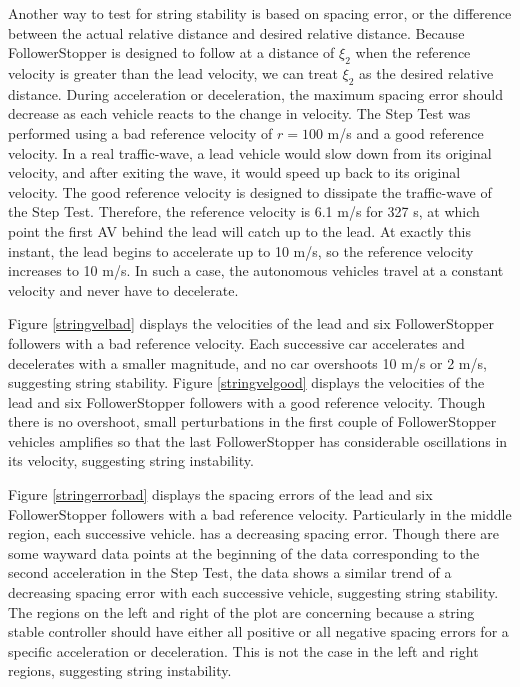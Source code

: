 \documentclass[conference]{IEEEtran}
\begin{document}
Another way to test for string stability is based on spacing error, or the difference between the actual relative distance and desired relative distance. Because FollowerStopper is designed to follow at a distance of $\xi_2$ when the reference velocity is greater than the lead velocity, we can treat $\xi_2$ as the desired relative distance. During acceleration or deceleration, the maximum spacing error should decrease as each vehicle reacts to the change in velocity. The Step Test was performed using a bad reference velocity of $r=100$ m/s and a good reference velocity. In a real traffic-wave, a lead vehicle would slow down from its original velocity, and after exiting the wave, it would speed up back to its original velocity. The good reference velocity is designed to dissipate the traffic-wave of the Step Test. Therefore, the reference velocity is 6.1 m/s for 327 s, at which point the first AV behind the lead will catch up to the lead. At exactly this instant, the lead begins to accelerate up to 10 m/s, so the reference velocity increases to 10 m/s. In such a case, the autonomous vehicles travel at a constant velocity and never have to decelerate.

Figure \ref{stringvelbad} displays the velocities of the lead and six FollowerStopper followers with a bad reference velocity. Each successive car accelerates and decelerates with a smaller magnitude, and no car overshoots 10 m/s or 2 m/s, suggesting string stability. Figure \ref{stringvelgood} displays the velocities of the lead and six FollowerStopper followers with a good reference velocity. Though there is no overshoot, small perturbations in the first couple of FollowerStopper vehicles amplifies so that the last FollowerStopper has considerable oscillations in its velocity, suggesting string instability. 

Figure \ref{stringerrorbad} displays the spacing errors of the lead and six FollowerStopper followers with a bad reference velocity. Particularly in the middle region, each successive vehicle. has a decreasing spacing error. Though there are some wayward data points at the beginning of the data corresponding to the second acceleration in the Step Test, the data shows a similar trend of a decreasing spacing error with each successive vehicle, suggesting string stability. The regions on the left and right of the plot are concerning because a string stable controller should have either all positive or all negative spacing errors for a specific acceleration or deceleration. This is not the case in the left and right regions, suggesting string instability.
\end{document}
